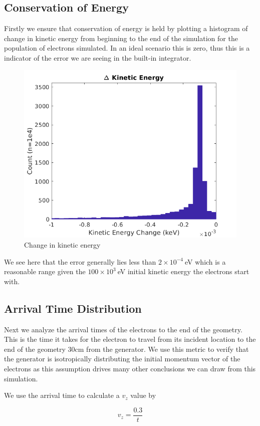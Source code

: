 \documentclass[12pt,letterpaper]{article}
\begin{document}
\subsection{Conservation of Energy}

Firstly we ensure that conservation of energy is held by plotting a histogram of change in kinetic energy from beginning to the end of the simulation for the population of electrons simulated. In an ideal scenario this is zero, thus this is a indicator of the error we are seeing in the built-in integrator. 

    \begin{figure}[H]
    \centering
    \includegraphics[width=0.7\linewidth]{img/ke.png}
    \caption{Change in kinetic energy}
    \end{figure}
    
We see here that the error generally lies less than $2\times10^{-4}~$eV which is a reasonable range given the $100\times10^{3}~$eV initial kinetic energy the electrons start with.

\subsection{Arrival Time Distribution}

Next we analyze the arrival times of the electrons to the end of the geometry. This is the time it takes for the electron to travel from its incident location to the end of the geometry 30cm from the generator. We use this metric to verify that the generator is isotropically distributing the initial momentum vector of the electrons as this assumption drives many other conclusions we can draw from this simulation. 

We use the arrival time to calculate a $v_z$ value by

\[ v_z = \frac{0.3}{t} \]
\end{document}
